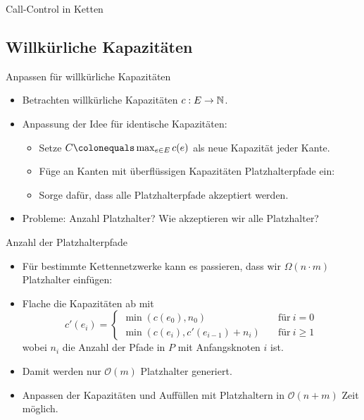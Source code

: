 \begin{section}{Call-Control in Ketten}
\subsection{Willkürliche Kapazitäten}
\begin{frame}{Anpassen für willkürliche Kapazitäten}
	\begin{itemize}
		\pause\item Betrachten willkürliche Kapazitäten $c: E \rightarrow \mathbb N$.
		\pause\item Anpassung der Idee für identische Kapazitäten:
		\begin{itemize}
			\pause\item Setze $C \colonequals \max_{e \in E} c(e)$ als neue Kapazität jeder Kante.
			\pause\item Füge an Kanten mit überflüssigen Kapazitäten Platzhalterpfade ein:
				\begin{figure}[htbp]
					\centering
					\small
					\def\svgwidth{200bp}
					
				\end{figure}
			\pause\item Sorge dafür, dass alle Platzhalterpfade akzeptiert werden.
		\end{itemize}
		\pause\item Probleme: Anzahl Platzhalter? Wie akzeptieren wir alle Platzhalter?
	\end{itemize}
\end{frame}
\begin{frame}{Anzahl der Platzhalterpfade}
	\begin{itemize}
		\pause\item Für bestimmte Kettennetzwerke kann es passieren, dass wir $\Omega(n\cdot m)$ Platzhalter einfügen:
		\begin{figure}[htbp]
			\centering
			\small
			\def\svgwidth{180bp}
			
		\end{figure}
		\pause\item Flache die Kapazitäten ab mit 
		\[
		c'(e_i) =
		\begin{cases}
		\min(c(e_0), n_0) &\quad\text{für}\ i=0\\
		\min(c(e_i), c'(e_{i-1}) + n_i) &\quad\text{für}\ i \geq 1
		\end{cases}
		\]
		wobei $n_i$ die Anzahl der Pfade in $P$ mit Anfangsknoten $i$ ist.
		\pause\item Damit werden nur $\mathcal{O}(m)$ Platzhalter generiert.
		\pause\item Anpassen der Kapazitäten und Auffüllen mit Platzhaltern in $\mathcal{O}(n+m)$ Zeit möglich.
	\end{itemize}
\end{frame}


\end{section}

